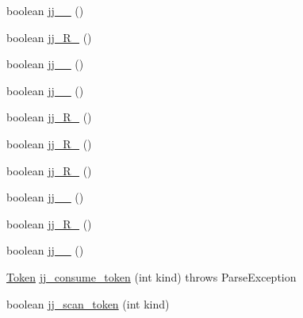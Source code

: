 \begin{DoxyCompactItemize}
\item 
boolean \hyperlink{classuk_1_1ac_1_1manchester_1_1cs_1_1owl_1_1owlapi_1_1turtle_1_1parser_1_1_turtle_parser_a68f8b1bbf6e29b28e73dd9fc73a722ca}{jj\-\_\-\_} ()
\item 
boolean \hyperlink{classuk_1_1ac_1_1manchester_1_1cs_1_1owl_1_1owlapi_1_1turtle_1_1parser_1_1_turtle_parser_a4bfe125ce1a27f305517e2d42c5500d7}{jj\-\_\-R\-\_} ()
\item 
boolean \hyperlink{classuk_1_1ac_1_1manchester_1_1cs_1_1owl_1_1owlapi_1_1turtle_1_1parser_1_1_turtle_parser_a7edad9feeb34d365ea2d1c2d69adb20f}{jj\-\_\-\_} ()
\item 
boolean \hyperlink{classuk_1_1ac_1_1manchester_1_1cs_1_1owl_1_1owlapi_1_1turtle_1_1parser_1_1_turtle_parser_a913d3677c83b851a37c619ef35239977}{jj\-\_\-\_} ()
\item 
boolean \hyperlink{classuk_1_1ac_1_1manchester_1_1cs_1_1owl_1_1owlapi_1_1turtle_1_1parser_1_1_turtle_parser_a9b7937487bab2feb54b275201936f709}{jj\-\_\-R\-\_} ()
\item 
boolean \hyperlink{classuk_1_1ac_1_1manchester_1_1cs_1_1owl_1_1owlapi_1_1turtle_1_1parser_1_1_turtle_parser_ae5db07a9e635477bca049d79ed904377}{jj\-\_\-R\-\_} ()
\item 
boolean \hyperlink{classuk_1_1ac_1_1manchester_1_1cs_1_1owl_1_1owlapi_1_1turtle_1_1parser_1_1_turtle_parser_aa2a65cbbd4612ae33efd5614cbb26b31}{jj\-\_\-R\-\_} ()
\item 
boolean \hyperlink{classuk_1_1ac_1_1manchester_1_1cs_1_1owl_1_1owlapi_1_1turtle_1_1parser_1_1_turtle_parser_a2891b8ad2b3921bbc3edfdf01811dba1}{jj\-\_\-\_} ()
\item 
boolean \hyperlink{classuk_1_1ac_1_1manchester_1_1cs_1_1owl_1_1owlapi_1_1turtle_1_1parser_1_1_turtle_parser_ac4970e38ac523d85684999ddc1ca2beb}{jj\-\_\-R\-\_} ()
\item 
boolean \hyperlink{classuk_1_1ac_1_1manchester_1_1cs_1_1owl_1_1owlapi_1_1turtle_1_1parser_1_1_turtle_parser_ac26eca2beb6729355896bd9091eaa8cb}{jj\-\_\-\_} ()
\item 
\hyperlink{classuk_1_1ac_1_1manchester_1_1cs_1_1owl_1_1owlapi_1_1turtle_1_1parser_1_1_token}{Token} \hyperlink{classuk_1_1ac_1_1manchester_1_1cs_1_1owl_1_1owlapi_1_1turtle_1_1parser_1_1_turtle_parser_a7fd84ef5652bde872169275b75c05a60}{jj\-\_\-consume\-\_\-token} (int kind)  throws Parse\-Exception 
\item 
boolean \hyperlink{classuk_1_1ac_1_1manchester_1_1cs_1_1owl_1_1owlapi_1_1turtle_1_1parser_1_1_turtle_parser_a4e702fa9eb67a6e072e56cfd8e67c841}{jj\-\_\-scan\-\_\-token} (int kind)

\end{DoxyCompactItemize}
